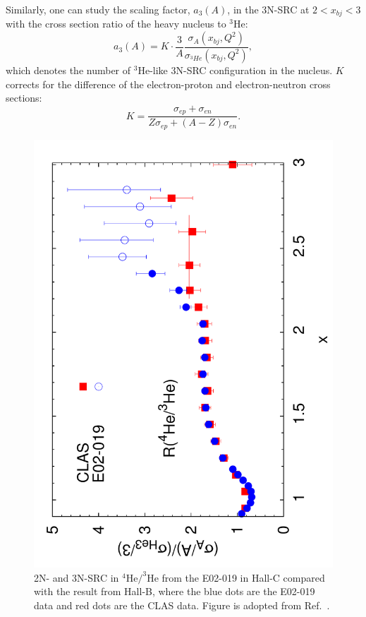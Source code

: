 Similarly, one can study the scaling factor, $a_{3}(A)$, in the 3N-SRC at $2<x_{bj}<3$ with the cross section ratio of the heavy nucleus to $\mathrm{^{3}He}$:
\begin{equation}
  a_{3}(A) = K\cdot\frac{3}{A}\frac{\sigma_{A}(x_{bj},Q^{2})}{\sigma_{^{3}He}(x_{bj},Q^{2})},
  \label{src_a3}
\end{equation}
which denotes the number of $\mathrm{^{3}He}$-like 3N-SRC configuration in the nucleus. $K$ corrects for the difference of the electron-proton and electron-neutron cross sections:
\begin{equation}
  K = \frac{\sigma_{ep}+\sigma_{en}}{Z\sigma_{ep}+(A-Z)\sigma_{en}}.
\end{equation}

\begin{figure}[!ht]
  \begin{center}
    \includegraphics[type=pdf,ext=.pdf,read=.pdf,angle=270.,width=0.80\linewidth]{./figures/physics/E02019_2NSRC_3NSRC}
    \caption[2N- and 3N-SRC in $\mathrm{^{4}He/^{3}He}$ from the E02-019]{\footnotesize{2N- and 3N-SRC in $\mathrm{^{4}He/^{3}He}$ from the E02-019 in Hall-C compared with the result from Hall-B, where the blue dots are the E02-019 data and red dots are the CLAS data. Figure is adopted from Ref.~\cite{PhysRevLett.108.092502}.}}
    \label{E02019_2NSRC_3NSRC}
  \end{center}
\end{figure} 
